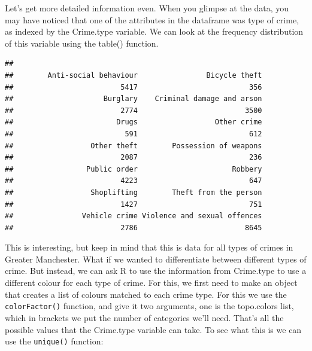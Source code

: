 \documentclass[]{book}
\newenvironment{Shaded}{\begin{snugshade}}{\end{snugshade}}
\newcommand{\KeywordTok}[1]{\textcolor[rgb]{0.13,0.29,0.53}{\textbf{#1}}}
\newcommand{\NormalTok}[1]{#1}
\newcommand{\OperatorTok}[1]{\textcolor[rgb]{0.81,0.36,0.00}{\textbf{#1}}}
\begin{document}
Let's get more detailed information even. When you glimpse at the data, you may have noticed that one of the attributes in the dataframe was type of crime, as indexed by the Crime.type variable. We can look at the frequency distribution of this variable using the table() function.

\begin{Shaded}
\end{Shaded}

\begin{verbatim}
## 
##        Anti-social behaviour                Bicycle theft 
##                         5417                          356 
##                     Burglary    Criminal damage and arson 
##                         2774                         3500 
##                        Drugs                  Other crime 
##                          591                          612 
##                  Other theft        Possession of weapons 
##                         2087                          236 
##                 Public order                      Robbery 
##                         4223                          647 
##                  Shoplifting        Theft from the person 
##                         1427                          751 
##                Vehicle crime Violence and sexual offences 
##                         2786                         8645
\end{verbatim}

This is interesting, but keep in mind that this is data for all types of crimes in Greater Manchester. What if we wanted to differentiate between different types of crime. But instead, we can ask R to use the information from Crime.type to use a different colour for each type of crime. For this, we first need to make an object that creates a list of colours matched to each crime type. For this we use the \texttt{colorFactor()} function, and give it two arguments, one is the topo.colors list, which in brackets we put the number of categories we'll need. That's all the possible values that the Crime.type variable can take. To see what this is we can use the \texttt{unique()} function:

\begin{Shaded}
\end{Shaded}
\end{document}
